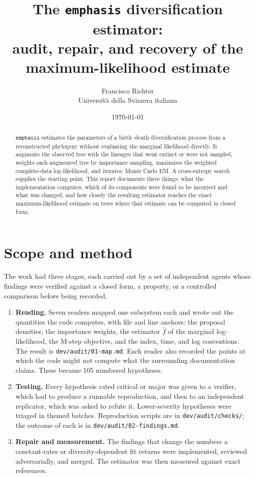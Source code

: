 \documentclass[11pt,a4paper]{article}
\title{\textbf{The \texttt{emphasis} diversification estimator:\\
audit, repair, and recovery of the maximum-likelihood estimate}}
\author{Francisco Richter\\\small Università della Svizzera italiana}
\date{\today}
\newcommand{\code}[1]{\texttt{\small #1}}
\begin{document}
\maketitle

\begin{abstract}
\noindent
\code{emphasis} estimates the parameters of a birth--death diversification process from a
reconstructed phylogeny without evaluating the marginal likelihood directly. It augments the
observed tree with the lineages that went extinct or were not sampled, weights each augmented
tree by importance sampling, maximises the weighted complete-data log-likelihood, and iterates:
Monte Carlo EM. A cross-entropy search supplies the starting point. This report documents three
things: what the implementation computes, which of its components were found to be incorrect and
what was changed, and how closely the resulting estimator reaches the exact maximum-likelihood
estimate on trees where that estimate can be computed in closed form.
\end{abstract}

\section{Scope and method}

The work had three stages, each carried out by a set of independent agents whose findings were
verified against a closed form, a property, or a controlled comparison before being recorded.

\begin{enumerate}[leftmargin=1.4em]
\item \textbf{Reading.} Seven readers mapped one subsystem each and wrote out the quantities the
  code computes, with file and line anchors: the proposal densities, the importance weights, the
  estimator $\widehat{f}$ of the marginal log-likelihood, the M-step objective, and the index,
  time, and log conventions. The result is \code{dev/audit/01-map.md}. Each reader also recorded
  the points at which the code might not compute what the surrounding documentation claims. These
  became 105 numbered hypotheses.
\item \textbf{Testing.} Every hypothesis rated critical or major was given to a verifier, which
  had to produce a runnable reproduction, and then to an independent replicator, which was asked
  to refute it. Lower-severity hypotheses were triaged in themed batches. Reproduction scripts are
  in \code{dev/audit/checks/}; the outcome of each is in \code{dev/audit/02-findings.md}.
\item \textbf{Repair and measurement.} The findings that change the numbers a constant-rates or
  diversity-dependent fit returns were implemented, reviewed adversarially, and merged. The
  estimator was then measured against exact references.
\end{enumerate}
\end{document}
